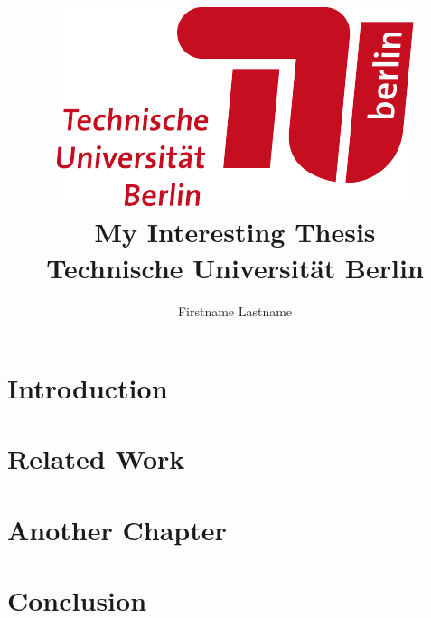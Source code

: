 \documentclass[12pt,twoside]{report}
\title{
  \includegraphics{logo.pdf}\\ 
  \vspace{2cm}
  {My Interesting Thesis}\\
  {\large Technische Universität Berlin}\\
}
\author{Firstname Lastname}
\begin{document}
\maketitle






\tableofcontents

\chapter{Introduction}
\label{introduction}


\chapter{Related Work}
\label{related-work}


\chapter{Another Chapter}
\label{another_chapter}


\chapter{Conclusion}
\label{conclusion}



\end{document}
